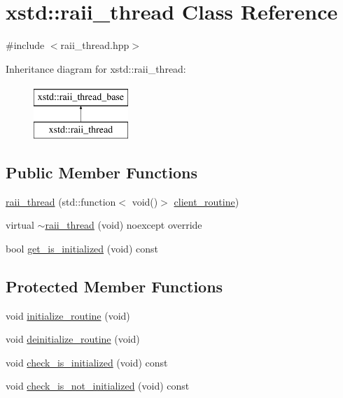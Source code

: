 \hypertarget{classxstd_1_1raii__thread}{\section{xstd\-:\-:raii\-\_\-thread Class Reference}
\label{classxstd_1_1raii__thread}
}


{\ttfamily \#include $<$raii\-\_\-thread.\-hpp$>$}

Inheritance diagram for xstd\-:\-:raii\-\_\-thread\-:\begin{figure}[H]
\begin{center}
\leavevmode
\includegraphics[height=2.000000cm]{classxstd_1_1raii__thread}
\end{center}
\end{figure}
\subsection*{Public Member Functions}
\begin{DoxyCompactItemize}
\item 
\hyperlink{classxstd_1_1raii__thread_a8bc39a85a55f9becb860febe87f9175c}{raii\-\_\-thread} (std\-::function$<$ void()$>$ \hyperlink{classxstd_1_1raii__thread__base_a6b3e160c7eb131008410a16c460b03ff}{client\-\_\-routine})
\item 
virtual \hyperlink{classxstd_1_1raii__thread_a62d65031e1fa7e6ea46682313187832a}{$\sim$raii\-\_\-thread} (void) noexcept override
\item 
bool \hyperlink{classxstd_1_1raii__thread__base_a9657cb2eddab6ef67b8884bff38ccbcb}{get\-\_\-is\-\_\-initialized} (void) const 
\end{DoxyCompactItemize}
\subsection*{Protected Member Functions}
\begin{DoxyCompactItemize}
\item 
void \hyperlink{classxstd_1_1raii__thread__base_ad3b035606a096d6117de8de40c665507}{initialize\-\_\-routine} (void)
\item 
void \hyperlink{classxstd_1_1raii__thread__base_ae423d8023eb8c3bed9b4b0f11c055c2d}{deinitialize\-\_\-routine} (void)
\item 
void \hyperlink{classxstd_1_1raii__thread__base_aef97fe42b58be66ddd0bf90462b772a8}{check\-\_\-is\-\_\-initialized} (void) const 
\item 
void \hyperlink{classxstd_1_1raii__thread__base_a6a179dd57da4ec48177c0cd38da0702e}{check\-\_\-is\-\_\-not\-\_\-initialized} (void) const 
\end{DoxyCompactItemize}
